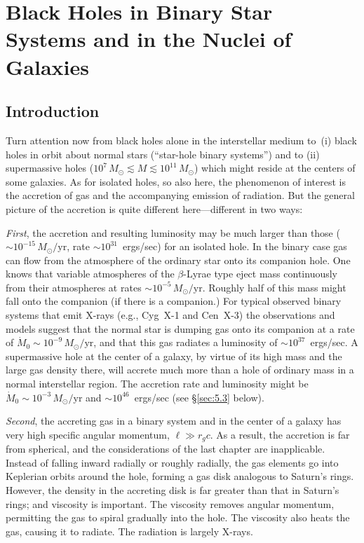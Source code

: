 
\section{Black Holes in Binary Star Systems and in the Nuclei of Galaxies}
\label{sec:5}

\subsection{Introduction}
\label{sec:5.1}

Turn attention now from black holes alone in the interstellar medium to~(i)
black holes in orbit about normal stars (``star-hole binary systems'') and to
(ii) supermassive holes ($10^7\,M_\odot \lesssim M \lesssim 10^{11}\,M_\odot$) which might reside at the
centers of some galaxies.  As for isolated holes, so also here, the phenomenon
of interest is the accretion of gas and the accompanying emission of radiation.
But the general picture of the accretion is quite different here---different in two
ways:

\emph{First}, the accretion and resulting luminosity may be much larger than
those ($\sim\!10^{-15}\,M_\odot/\text{yr}$, rate $\sim\!10^{31}$~ergs/sec) for an isolated hole.
In the binary case
gas can flow from the atmosphere of the ordinary star onto its companion hole.
One knows that variable atmospheres of the $\beta$-Lyrae type eject mass continuously from
their atmospheres at rates $\sim\!10^{-5}\,M_\odot/\text{yr}$.  Roughly half of this mass might fall
onto the companion (if there is a companion.)  For typical observed binary
systems that emit X-rays (e.g., Cyg~X-1 and Cen~X-3) the observations and
models suggest that the normal star is dumping gas onto its companion at a rate
of $\dot{M}_0 \sim 10^{-9}\,M_\odot/\text{yr}$, and that this gas radiates a luminosity of $\sim\!10^{37}$~ergs/sec.
A supermassive hole at the center of a galaxy, by virtue of its high mass and the
large gas density there, will accrete much more than a hole of ordinary mass in a
normal interstellar region.  The accretion rate and luminosity might be
$\dot{M}_0 \sim 10^{-3}\,M_\odot/\text{yr}$ and $\sim\!10^{46}$~ergs/sec (see \S\ref{sec:5.3} below).

\emph{Second}, the accreting gas in a binary system and in the center of a galaxy
has very high specific angular momentum, $\ell \gg r_g c$.  As a result, the accretion is
far from spherical, and the considerations of the last chapter are inapplicable.
Instead of falling inward radially or roughly radially, the gas elements go into
Keplerian orbits around the hole, forming a gas disk analogous to Saturn's
rings.  However, the density in the accreting disk is far greater than that in
Saturn's rings; and viscosity is important.  The viscosity removes angular momentum,
permitting the gas to spiral gradually into the hole.  The viscosity also heats the
gas, causing it to radiate.  The radiation is largely X-rays.

